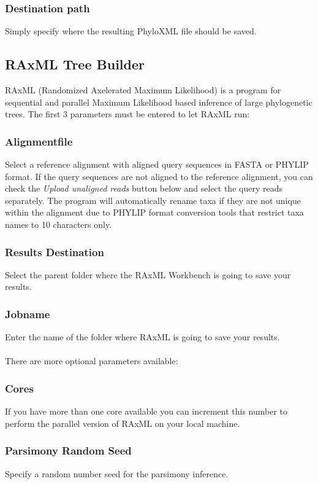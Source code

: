 \documentclass{article}
\begin{document}
		\subsubsection*{Destination path}
		Simply specify where the resulting PhyloXML file should be saved.
		
	\subsection{RAxML Tree Builder}
		RAxML (Randomized Axelerated Maximum Likelihood) is a program for sequential and parallel Maximum Likelihood based inference of large phylogenetic trees. The first 3 parameters must be entered to let RAxML run:
		\subsubsection*{Alignmentfile}
			Select a reference alignment with aligned query sequences in FASTA or PHYLIP format. If the query sequences are not aligned to the reference alignment, you can check the \textit{Upload unaligned reads} button below and select the query reads separately. The program will automatically rename taxa if they are not unique within the alignment due to PHYLIP format conversion tools that restrict taxa names to 10 characters only.
		\subsubsection*{Results Destination}
			Select the parent folder where the RAxML Workbench is going to save your results.
		\subsubsection*{Jobname}
			Enter the name of the folder where RAxML is going to save your results. \\\\
			There are more optional parameters available:
		\subsubsection*{Cores}
			If you have more than one core available you can increment this number to perform the parallel version of RAxML on your local machine.
		\subsubsection*{Parsimony Random Seed}
			Specify a random number seed for the parsimony inference.
\end{document}
